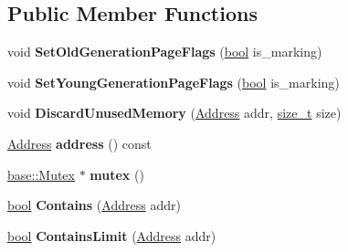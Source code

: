 \subsection*{Public Member Functions}
\begin{DoxyCompactItemize}
\item 
\mbox{\label{classv8_1_1internal_1_1MemoryChunk_ac9518b5898e8973e61be66e714e4e47d}} 
void {\bfseries Set\+Old\+Generation\+Page\+Flags} (\mbox{\hyperlink{classbool}{bool}} is\+\_\+marking)
\item 
\mbox{\label{classv8_1_1internal_1_1MemoryChunk_afed2f0d3fc8781a703f5f68ca23e3ef1}} 
void {\bfseries Set\+Young\+Generation\+Page\+Flags} (\mbox{\hyperlink{classbool}{bool}} is\+\_\+marking)
\item 
\mbox{\label{classv8_1_1internal_1_1MemoryChunk_a0b25ee862dcfdfae3cbfde8c46bcd62b}} 
void {\bfseries Discard\+Unused\+Memory} (\mbox{\hyperlink{classuintptr__t}{Address}} addr, \mbox{\hyperlink{classsize__t}{size\+\_\+t}} size)
\item 
\mbox{\label{classv8_1_1internal_1_1MemoryChunk_a73d4d1837ecc5f047a1ff2f79a663429}} 
\mbox{\hyperlink{classuintptr__t}{Address}} {\bfseries address} () const
\item 
\mbox{\label{classv8_1_1internal_1_1MemoryChunk_a8f584c3703d4785a6e6693af638c6ce5}} 
\mbox{\hyperlink{classv8_1_1base_1_1Mutex}{base\+::\+Mutex}} $\ast$ {\bfseries mutex} ()
\item 
\mbox{\label{classv8_1_1internal_1_1MemoryChunk_a1c39761f226a79df38a27e8c6e80d17d}} 
\mbox{\hyperlink{classbool}{bool}} {\bfseries Contains} (\mbox{\hyperlink{classuintptr__t}{Address}} addr)
\item 
\mbox{\label{classv8_1_1internal_1_1MemoryChunk_a3c63106e1a91ed8f9ae53fdda7a475f0}} 
\mbox{\hyperlink{classbool}{bool}} {\bfseries Contains\+Limit} (\mbox{\hyperlink{classuintptr__t}{Address}} addr)
\item 
\mbox{\label{classv8_1_1internal_1_1MemoryChunk_a1650c2966f0248a226d42edb1fac7dcd}} 

\end{DoxyCompactItemize}
